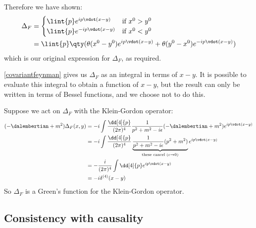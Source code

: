 \documentclass{jknotes} %
\begin{document}
Therefore we have shown:
\begin{align}
    \Delta_F &= 
    \begin{cases}
        \lint{p}e^{ip\vdot(x-y)} & \text{if } x^0>y^0 \\
        \lint{p}e^{-ip\vdot(x-y)} & \text{if } x^0<y^0
    \end{cases} \\
    &= \lint{p}\qty(\theta(x^0-y^0)e^{ip\vdot(x-y)} + \theta(y^0-x^0)e^{-ip\vdot(x-y)})
\end{align}
which is our original expression for \(\Delta_F\), as required.

\eqref{covariantfeynman} gives us \(\Delta_F\) as an integral in terms of \(x-y\). It is possible to evaluate this integral to obtain a function of \(x-y\), but the result can only be written in terms of Bessel functions, and we choose not to do this.

Suppose we act on \(\Delta_F\) with the Klein-Gordon operator:
\begin{align}
    (-\dalembertian + m^2)\Delta_F(x,y) &= -i\int\frac{\dd[4]{p}}{(2\pi)^4} \frac{1}{p^2+m^2-i\epsilon}(-\dalembertian + m^2)e^{ip\vdot(x-y)} \\
    &= -i \int \frac{\dd[4]{p}}{(2\pi)^4}\underbrace{\frac{1}{p^2+m^2-i\epsilon}(p^2+m^2)}_{\text{these cancel }(\epsilon\rightarrow0)} e^{ip\vdot(x-y)} \\
    &= -\frac{i}{(2\pi)^4}\int\dd[4]{p}e^{ip\vdot(x-y)}\\
    &= -i\delta^{(4)}(x-y)
\end{align}
So \(\Delta_F\) is a Green's function for the Klein-Gordon operator.

\subsection{Consistency with causality}
\end{document}
